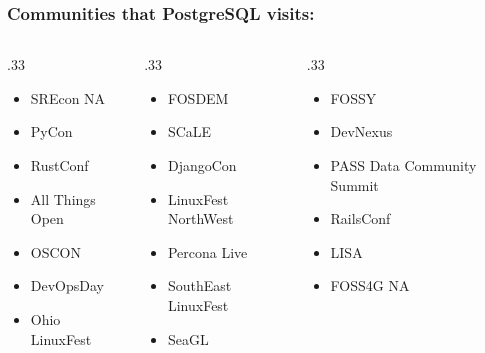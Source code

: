 \frame
{
  \frametitle{Communities that PostgreSQL visits:}

  \begin{columns}
    \begin{column}[T]{.33\textwidth}
      \begin{itemize}
        \item SREcon NA
        \item PyCon
        \item RustConf
        \item All Things Open
        \item OSCON
        \item DevOpsDay
        \item Ohio LinuxFest
      \end{itemize}
    \end{column}
    \begin{column}[T]{.33\textwidth}
      \begin{itemize}
        \item FOSDEM
        \item SCaLE
        \item DjangoCon
        \item LinuxFest NorthWest
        \item Percona Live
        \item SouthEast LinuxFest
        \item SeaGL
      \end{itemize}
    \end{column}
    \begin{column}[T]{.33\textwidth}
      \begin{itemize}
        \item FOSSY
        \item DevNexus
        \item PASS Data Community Summit
        \item RailsConf
        \item LISA
        \item FOSS4G NA
      \end{itemize}
    \end{column}
  \end{columns}
}


